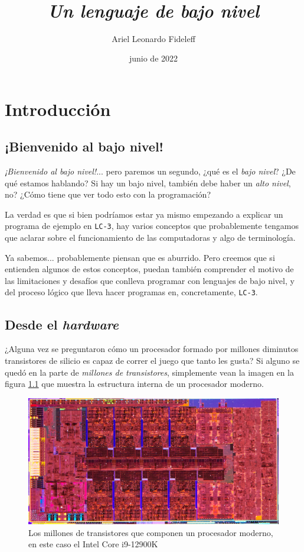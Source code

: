 \documentclass[a4paper, titlepage]{report}
\title{
	\textsc{\Large{}\raggedleft{Instalación y Reemplazo de Componentes Internos}}\\
		 \vspace{18pt}
		\fontsize{40}{40}{\textbf{\texttt{LC-3}}}\\
		\Huge\textbf{\textit{Un lenguaje de bajo nivel}}
\vspace{-10pt}
}
\author{\Large{}Ariel Leonardo Fideleff}
\date{junio de 2022}
\begin{document}
	\maketitle
	
	\thispagestyle{plain}
	\tableofcontents
	
	\chapter{Introducción}
	
	\section{¡Bienvenido al bajo nivel!}
	
	\textit{¡Bienvenido al bajo nivel!}... pero paremos un segundo, ¿qué es el \textit{bajo nivel}? ¿De qué estamos hablando? Si hay un bajo nivel, también debe haber un \textit{alto nivel}, no? ¿Cómo tiene que ver todo esto con la programación?
	
	La verdad es que si bien podríamos estar ya mismo empezando a explicar un programa de ejemplo en \texttt{LC-3}, hay varios conceptos que probablemente tengamos que aclarar sobre el funcionamiento de las computadoras y algo de terminología.
	
	Ya sabemos... probablemente piensan que es aburrido. Pero creemos que si entienden algunos de estos conceptos, puedan también comprender el motivo de las limitaciones y desafíos que conlleva programar con lenguajes de bajo nivel, y del proceso lógico que lleva hacer programas en, concretamente, \texttt{LC-3}. 
	
	\section{Desde el \textit{hardware}}
	
	¿Alguna vez se preguntaron cómo un procesador formado por millones diminutos transistores de silicio es capaz de correr el juego que tanto les gusta? Si alguno se quedó en la parte de \textit{millones de transistores}, simplemente vean la imagen en la figura \ref{fig:die-img} que muestra la estructura interna de un procesador moderno.
	
	\begin{figure}[h]
		\centering
		\captionsetup{justification=centering}
		\includegraphics[width=.6\linewidth]{i9-die.jpg}
		\caption{Los millones de transistores que componen un procesador moderno, en este caso el Intel Core i9-12900K}
		\label{fig:die-img}
	\end{figure}
\end{document}
